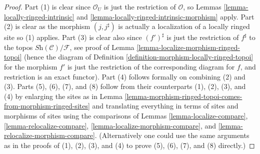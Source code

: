 \begin{proof}
Part (1) is clear since $\mathcal{O}_U$ is just the
restriction of $\mathcal{O}$, so
Lemmas \ref{lemma-locally-ringed-intrinsic} and
\ref{lemma-locally-ringed-intrinsic-morphism}
apply. Part (2) is clear as the morphism $(j, j^\sharp)$
is actually a localization of a locally ringed site so (1) applies.
Part (3) is clear also since $(f')^\sharp$ is just the
restriction of $f^\sharp$ to the topos
$\textit{Sh}(\mathcal{C})/\mathcal{F}$, see proof of
Lemma \ref{lemma-localize-morphism-ringed-topoi}
(hence the diagram of
Definition \ref{definition-morphism-locally-ringed-topoi}
for the morphism $f'$ is just the restriction of the corresponding
diagram for $f$, and restriction is an exact functor).
Part (4) follows formally on combining (2) and (3).
Parts (5), (6), (7), and (8) follow from their counterparts
(1), (2), (3), and (4) by enlarging the sites as in
Lemma \ref{lemma-morphism-ringed-topoi-comes-from-morphism-ringed-sites}
and translating everything in terms of sites and morphisms of sites using
the comparisons of
Lemmas \ref{lemma-localize-compare},
\ref{lemma-relocalize-compare},
\ref{lemma-localize-morphism-compare}, and
\ref{lemma-relocalize-morphism-compare}.
(Alternatively one could use the same arguments as in the proofs
of (1), (2), (3), and (4) to prove (5), (6), (7), and (8) directly.)
\end{proof}











